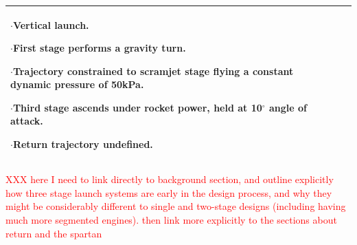 {\begin{landscape}
\begin{xltabular}{\linewidth}{|X|X|X|}
	
	$\cdot$Vertical launch.
	
	$\cdot$First stage performs a gravity turn. 
	
	$\cdot$Trajectory constrained to scramjet stage flying a constant dynamic pressure of 50kPa. 
	
	$\cdot$Third stage ascends under rocket power, held at 10$^\circ$ angle of attack. 
	
	$\cdot$Return trajectory undefined. 
	
	\\
	\hline
\end{xltabular}

\end{landscape}
}

\textcolor{red}{XXX here I need to link directly to background section, and outline explicitly how three stage launch systems are early in the design process, and why they might be considerably different to single and two-stage designs (including having much more segmented engines). then link more explicitly to the sections about return and the spartan}

